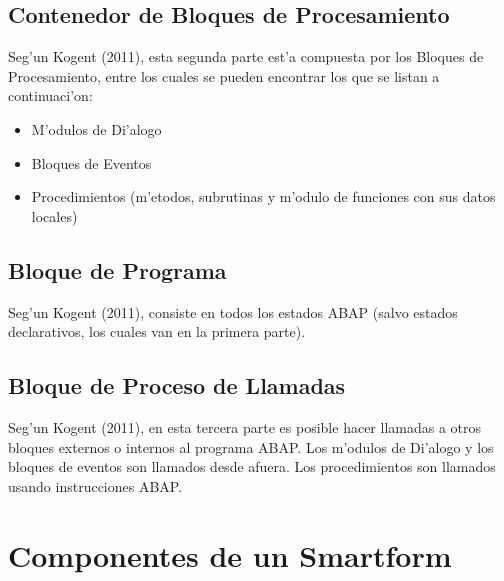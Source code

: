 \subsection{Contenedor de Bloques de Procesamiento}
	Seg'un Kogent (2011), esta segunda parte est'a compuesta por los Bloques de Procesamiento, entre los cuales se pueden encontrar los que se listan a continuaci'on:
\begin{itemize}
\item M'odulos de Di'alogo
\item Bloques de Eventos
\item Procedimientos (m'etodos, subrutinas y m'odulo de funciones con sus datos locales)
\end{itemize}

\subsection{Bloque de Programa}
	Seg'un Kogent (2011), consiste en todos los estados ABAP (salvo estados declarativos, los cuales van en la primera parte).
	
\subsection{Bloque de Proceso de Llamadas}
	Seg'un Kogent (2011), en esta tercera parte es posible hacer llamadas a otros bloques externos o internos al programa ABAP. Los m'odulos de Di'alogo y los bloques de eventos son llamados desde afuera. Los procedimientos son llamados usando instrucciones ABAP. 
	
\section{Componentes de un Smartform} \label{sect:componentes}
